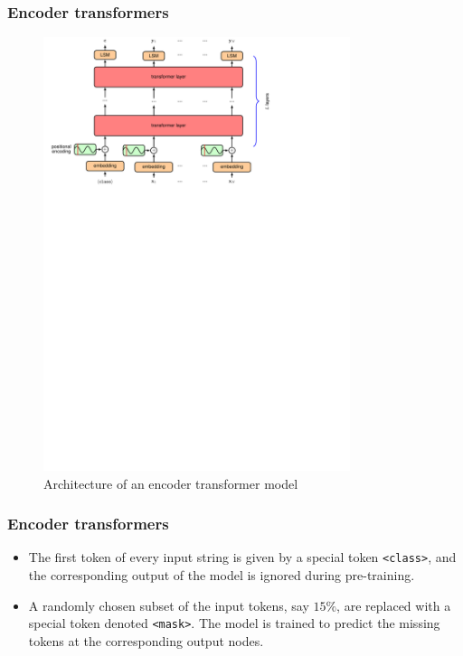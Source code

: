 \documentclass{beamer}
\begin{document}
\begin{frame}
    \frametitle{Encoder transformers}
    \begin{figure}
        \caption{Architecture of an encoder transformer model}
        \includegraphics[trim=0 16cm 0 0,clip=true,width=0.8\textwidth]{Figure_18.pdf}
    \end{figure}
\end{frame}

\begin{frame}
    \frametitle{Encoder transformers}
    \begin{itemize}
        \item The first token of every input string is given by a special token {\tt <class>}, and the corresponding output of the model is ignored during pre-training.
        \item A randomly chosen subset of the input tokens, say $15\%$, are replaced with a special token denoted {\tt <mask>}. The model is trained to predict the missing tokens at the corresponding output nodes.
    \end{itemize}
\end{frame}
\end{document}
